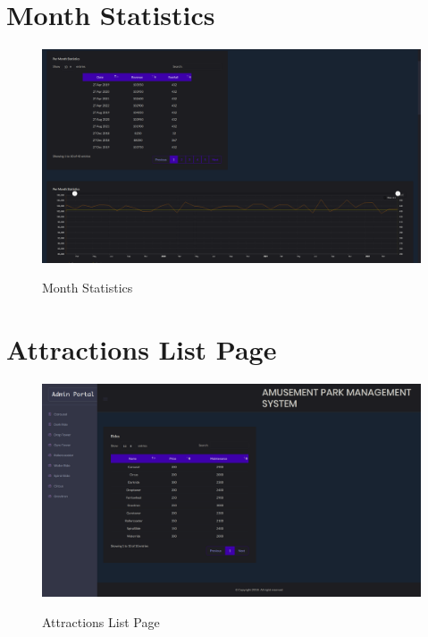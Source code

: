 \section{Month Statistics}
\begin{figure}[H]
\caption{Month Statistics}
\includegraphics[scale=.20]{./mth.png}
\\[0.2in]
\label{fig:Month Statistics}
\end{figure}

\thispagestyle{fancy}


\section{Attractions List Page}
\begin{figure}[H]
\caption{Attractions List Page}
\includegraphics[scale=.20]{./atr.png}
\\[0.2in]
\label{fig:Attractions List Page}
\end{figure}

\thispagestyle{fancy}


